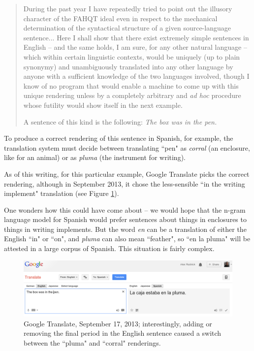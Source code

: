 \begin{quote}
During the past year I have repeatedly tried to point out the illusory
character of the FAHQT ideal even in respect to the mechanical determination of
the syntactical structure of a given source-language sentence... Here I shall
show that there exist extremely simple sentences in English -- and the same
holds, I am sure, for any other natural language -- which within certain
linguistic contexts, would be uniquely (up to plain synonymy) and unambiguously
translated into any other language by anyone with a sufficient knowledge of the
two languages involved, though I know of no program that would enable a machine
to come up with this unique rendering unless by a completely arbitrary and
\emph{ad hoc} procedure whose futility would show itself in the next example.

A sentence of this kind is the following: \emph{The box was in the pen.}
\end{quote}

To produce a correct rendering of this sentence in Spanish, for example, the
translation system must decide between translating ``pen" as \emph{corral} (an
enclosure, like for an animal) or as \emph{pluma} (the instrument for writing).

As of this writing, for this particular example, Google Translate picks the
correct rendering, although in September 2013, it chose the less-sensible 
``in the writing implement" translation (see Figure
\ref{fig:box-in-pen}).

One wonders how this could have come about -- we would hope that the n-gram
language model for Spanish would prefer sentences about things in enclosures to
things in writing implements.
But the word \emph{en} can be a translation of either the English ``in" or
``on", and \emph{pluma} can also mean ``feather", so ``en la pluma" will be
attested in a  large corpus of Spanish.
This situation is fairly complex.

\begin{figure}
  \includegraphics[width=12cm]{box-in-pen.png}
  \caption{Google Translate, September 17, 2013; interestingly, adding or
  removing the final period in the English sentence caused a switch between the
  ``pluma" and ``corral" renderings.}
  \label{fig:box-in-pen}
\end{figure}

